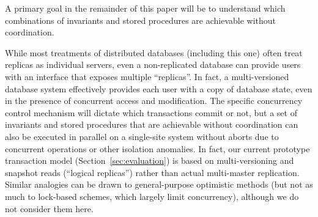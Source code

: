 A primary goal in the remainder of this paper will be to understand
which combinations of invariants and stored procedures are achievable
without coordination.


 While most treatments of
distributed databases (including this one) often treat replicas as
individual servers, even a non-replicated database can provide users
with an interface that exposes multiple ``replicas''. In fact, a
multi-versioned database system effectively provides each user with a
copy of database state, even in the presence of concurrent access and
modification. The specific concurrency control mechanism will dictate
which transactions commit or not, but a set of invariants and stored
procedures that are achievable without coordination can also be
executed in parallel on a single-site system without aborts due to
concurrent operations or other isolation anomalies.  In fact, our
current prototype transaction model (Section~\ref{sec:evaluation}) is
based on multi-versioning and snapshot reads (``logical replicas'')
rather than actual multi-master replication. Similar analogies can be
drawn to general-purpose optimistic methods (but not as much to
lock-based schemes, which largely limit concurrency), although we do
not consider them here.
